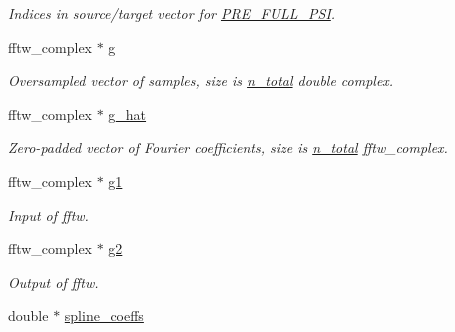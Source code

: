 \begin{CompactItemize}
\begin{CompactList}\small\item\em Indices in source/target vector for \hyperlink{group__nfft_g7ad8a7e19519b16340dabec48899c6a4}{PRE\_\-FULL\_\-PSI}. \item\end{CompactList}\item 
\hypertarget{structnfft__plan_844b51e453d6c80462eaad7844633539}{
fftw\_\-complex $\ast$ \hyperlink{structnfft__plan_844b51e453d6c80462eaad7844633539}{g}}
\label{structnfft__plan_844b51e453d6c80462eaad7844633539}

\begin{CompactList}\small\item\em Oversampled vector of samples, size is \hyperlink{structnfft__plan_d8a5fdac5bcf62d86479c800768fdeb7}{n\_\-total} double complex. \item\end{CompactList}\item 
\hypertarget{structnfft__plan_2dff6c2b829694a7d4cca5acc7c7d6d5}{
fftw\_\-complex $\ast$ \hyperlink{structnfft__plan_2dff6c2b829694a7d4cca5acc7c7d6d5}{g\_\-hat}}
\label{structnfft__plan_2dff6c2b829694a7d4cca5acc7c7d6d5}

\begin{CompactList}\small\item\em Zero-padded vector of Fourier coefficients, size is \hyperlink{structnfft__plan_d8a5fdac5bcf62d86479c800768fdeb7}{n\_\-total} fftw\_\-complex. \item\end{CompactList}\item 
\hypertarget{structnfft__plan_2190e7201c55214d153b4d91eaa7efda}{
fftw\_\-complex $\ast$ \hyperlink{structnfft__plan_2190e7201c55214d153b4d91eaa7efda}{g1}}
\label{structnfft__plan_2190e7201c55214d153b4d91eaa7efda}

\begin{CompactList}\small\item\em Input of fftw. \item\end{CompactList}\item 
\hypertarget{structnfft__plan_d96e0aa935ea3589e999c131c43d8a78}{
fftw\_\-complex $\ast$ \hyperlink{structnfft__plan_d96e0aa935ea3589e999c131c43d8a78}{g2}}
\label{structnfft__plan_d96e0aa935ea3589e999c131c43d8a78}

\begin{CompactList}\small\item\em Output of fftw. \item\end{CompactList}\item 
\hypertarget{structnfft__plan_3aaf44c4f0769644075d9fc5ed60afa0}{
double $\ast$ \hyperlink{structnfft__plan_3aaf44c4f0769644075d9fc5ed60afa0}{spline\_\-coeffs}}
\label{structnfft__plan_3aaf44c4f0769644075d9fc5ed60afa0}


\end{CompactItemize}

